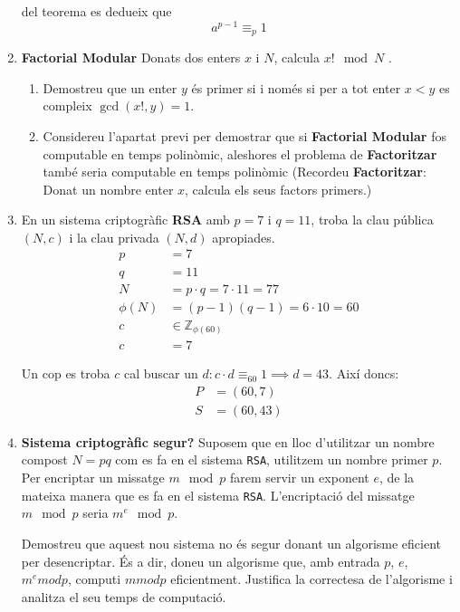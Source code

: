 \documentclass[a4paper]{article}
\begin{document}
\begin{enumerate}
del teorema es dedueix que
$$
a^{p - 1} \equiv_{p} 1
$$

\item \textbf{Factorial Modular} Donats dos enters $x$ i $N$, calcula $x! \mod N$ .
\begin{enumerate}
	\item Demostreu que un enter $y$ és primer si i només si per a tot enter $x < y$ es compleix $\gcd(x!, y) = 1$.
	\item Considereu l'apartat previ per demostrar que si \textbf{Factorial Modular} fos computable en temps polinòmic, aleshores el problema de \textbf{Factoritzar} també seria computable en temps polinòmic (Recordeu \textbf{Factoritzar}: Donat un nombre enter $x$, calcula els seus factors primers.)
\end{enumerate} 

\item En un sistema criptogràfic \textbf{RSA} amb $p = 7$ i $q = 11$, troba la clau pública $(N, c)$ i la clau privada $(N, d)$ apropiades.
\begin{align*}
	p &= 7 \\
	q &= 11 \\
	N &= p \cdot q = 7 \cdot 11 = 77 \\
	\phi(N) &= (p - 1)(q - 1) = 6 \cdot 10 = 60 \\
	c &\in \mathbb{Z}_{\phi(60)} \\
	c &= 7
\end{align*}

Un cop es troba $c$ cal buscar un $d : c \cdot d \equiv_{60} 1 \implies d = 43$. Així doncs:
\begin{align*}
	P &= (60, 7) \\
	S &= (60, 43)
\end{align*}

\item \textbf{Sistema criptogràfic segur?} Suposem que en lloc d'utilitzar un nombre compost $N = pq$ com es fa en el sistema \texttt{RSA}, utilitzem un nombre primer $p$. Per encriptar un missatge $m \mod p$ farem servir un exponent $e$, de la mateixa manera que es fa en el sistema \texttt{RSA}. L'encriptació del missatge $m \mod p$ seria $m^e \mod p$.

Demostreu que aquest nou sistema no és segur donant un algorisme eficient per
desencriptar. És a dir, doneu un algorisme que, amb entrada $p$, $e$, $m^e mod p$, computi $m mod p$ eficientment. Justifica la correctesa de l'algorisme i analitza el seu temps de computació.


\end{enumerate}
\end{document}
